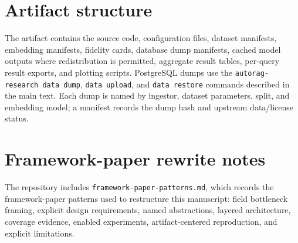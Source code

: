 \documentclass{article}
\begin{document}
\newpage



\appendix

\section{Artifact structure}

The artifact contains the source code, configuration files, dataset manifests, embedding manifests, fidelity cards, database dump manifests, cached model outputs where redistribution is permitted, aggregate result tables, per-query result exports, and plotting scripts. PostgreSQL dumps use the \texttt{autorag-research data dump}, \texttt{data upload}, and \texttt{data restore} commands described in the main text. Each dump is named by ingestor, dataset parameters, split, and embedding model; a manifest records the dump hash and upstream data/license status.

\section{Framework-paper rewrite notes}

The repository includes \texttt{framework-paper-patterns.md}, which records the framework-paper patterns used to restructure this manuscript: field bottleneck framing, explicit design requirements, named abstractions, layered architecture, coverage evidence, enabled experiments, artifact-centered reproduction, and explicit limitations.

\newpage

\end{document}
